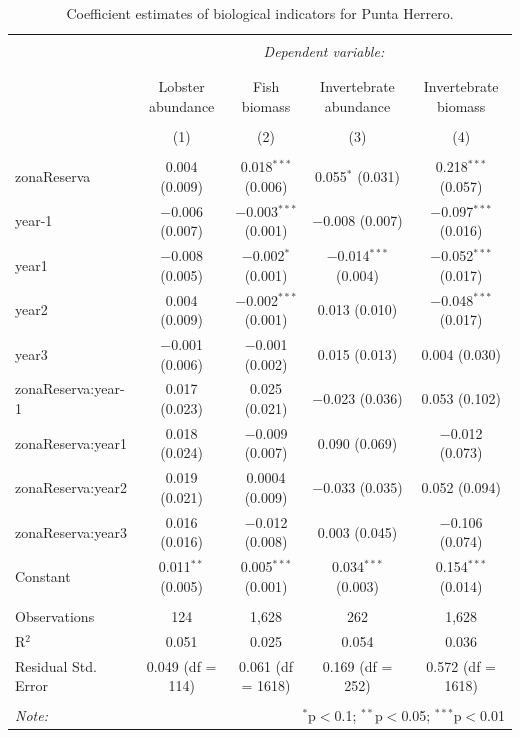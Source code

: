 \documentclass[utf8]{frontiers_suppmat} %
\begin{document}
\clearpage

\begin{table}[!htbp] \centering 
  \caption{Coefficient estimates of biological indicators for Punta Herrero.} 
  \label{} 
\small 
\begin{tabular}{@{\extracolsep{1pt}}lcccc} 
\\[-1.8ex]\hline 
\hline \\[-1.8ex] 
 & \multicolumn{4}{c}{\textit{Dependent variable:}} \\ 
\cline{2-5} 
\\[-1.8ex] & \multicolumn{4}{c}{} \\ 
 & Lobster abundance & Fish biomass & Invertebrate abundance & Invertebrate biomass \\ 
\\[-1.8ex] & (1) & (2) & (3) & (4)\\ 
\hline \\[-1.8ex] 
 zonaReserva & 0.004 (0.009) & 0.018$^{***}$ (0.006) & 0.055$^{*}$ (0.031) & 0.218$^{***}$ (0.057) \\ 
  year-1 & $-$0.006 (0.007) & $-$0.003$^{***}$ (0.001) & $-$0.008 (0.007) & $-$0.097$^{***}$ (0.016) \\ 
  year1 & $-$0.008 (0.005) & $-$0.002$^{*}$ (0.001) & $-$0.014$^{***}$ (0.004) & $-$0.052$^{***}$ (0.017) \\ 
  year2 & 0.004 (0.009) & $-$0.002$^{***}$ (0.001) & 0.013 (0.010) & $-$0.048$^{***}$ (0.017) \\ 
  year3 & $-$0.001 (0.006) & $-$0.001 (0.002) & 0.015 (0.013) & 0.004 (0.030) \\ 
  zonaReserva:year-1 & 0.017 (0.023) & 0.025 (0.021) & $-$0.023 (0.036) & 0.053 (0.102) \\ 
  zonaReserva:year1 & 0.018 (0.024) & $-$0.009 (0.007) & 0.090 (0.069) & $-$0.012 (0.073) \\ 
  zonaReserva:year2 & 0.019 (0.021) & 0.0004 (0.009) & $-$0.033 (0.035) & 0.052 (0.094) \\ 
  zonaReserva:year3 & 0.016 (0.016) & $-$0.012 (0.008) & 0.003 (0.045) & $-$0.106 (0.074) \\ 
  Constant & 0.011$^{**}$ (0.005) & 0.005$^{***}$ (0.001) & 0.034$^{***}$ (0.003) & 0.154$^{***}$ (0.014) \\ 
 \hline \\[-1.8ex] 
Observations & 124 & 1,628 & 262 & 1,628 \\ 
R$^{2}$ & 0.051 & 0.025 & 0.054 & 0.036 \\ 
Residual Std. Error & 0.049 (df = 114) & 0.061 (df = 1618) & 0.169 (df = 252) & 0.572 (df = 1618) \\ 
\hline 
\hline \\[-1.8ex] 
\textit{Note:}  & \multicolumn{4}{r}{$^{*}$p$<$0.1; $^{**}$p$<$0.05; $^{***}$p$<$0.01} \\ 
\end{tabular} 
\end{table}
\end{document}

